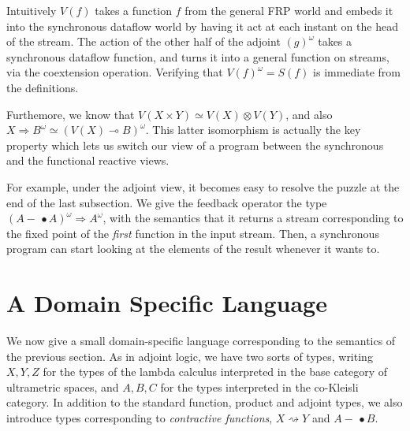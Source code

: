 \documentclass[nocopyrightspace,preprint]{sigplanconf}
\newcommand{\To}{\Rightarrow}
\newcommand{\shrink}{\rightsquigarrow}
\newcommand{\lolli}{\multimap}
\newcommand{\lollishrink}{-\!\!\!\,\bullet}
\begin{document}
Intuitively $V(f)$ takes a function $f$ from the general FRP world and
embeds it into the synchronous dataflow world by having it act at each
instant on the head of the stream. The action of the other half of the
adjoint $(g)^\omega$ takes a synchronous dataflow function, and turns
it into a general function on streams, via the coextension operation. 
Verifying that $V(f)^\omega = S(f)$ is immediate from the definitions. 

Furthemore, we know that $V(X \times Y) \simeq V(X) \otimes V(Y)$, and
also $X \To B^\omega \simeq (V(X) \lolli B)^\omega$. This latter
isomorphism is actually the key property which lets us switch our view
of a program between the synchronous and the functional reactive
views.

For example, under the adjoint view, it becomes easy to resolve the
puzzle at the end of the last subsection. We give the feedback
operator the type $(A \lollishrink A)^\omega \To A^\omega$, with
the semantics that it returns a stream corresponding to the fixed
point of the \emph{first} function in the input stream. Then, a
synchronous program can start looking at the elements of the
result whenever it wants to.

\section{A Domain Specific Language}

We now give a small domain-specific language
corresponding to the semantics of the previous section. As in adjoint
logic, we have two sorts of types, writing $X,Y,Z$ for the types of
the lambda calculus interpreted in the base category of ultrametric
spaces, and $A,B,C$ for the types interpreted in the co-Kleisli
category. In addition to the standard function, product and adjoint
types, we also introduce types corresponding to \emph{contractive
  functions}, $X \shrink Y$ and $A \lollishrink B$.
\end{document}

